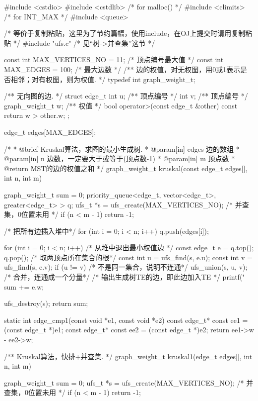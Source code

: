 \begin{Codex}[label=kruskal.c]
#include <cstdio>
#include <cstdlib>  /* for malloc() */
#include <climits>  /* for INT_MAX */
#include <queue>

/* 等价于复制粘贴，这里为了节约篇幅，使用include，在OJ上提交时请用复制粘贴 */
#include "ufs.c"  /* 见“树->并查集”这节 */

const int MAX_VERTICES_NO = 11; /* 顶点编号最大值 */
const int MAX_EDGES = 100;  /* 最大边数 */
/** 边的权值，对无权图，用0或1表示是否相邻；对有权图，则为权值. */
typedef int graph_weight_t;

/** 无向图的边. */
struct edge_t{
    int u;  /** 顶点编号 */
    int v;  /** 顶点编号 */
    graph_weight_t w;  /** 权值 */
    bool operator>(const edge_t &other) const {
        return w > other.w;
    }
};

edge_t edges[MAX_EDGES];


/*
  * @brief Kruskal算法，求图的最小生成树.
  * @param[in] edges 边的数组
  * @param[in] n 边数，一定要大于或等于(顶点数-1)
  * @param[in] m 顶点数
  * @return MST的边的权值之和
  */
graph_weight_t kruskal(const edge_t edges[], int n, int m) {
    graph_weight_t sum = 0;
    priority_queue<edge_t, vector<edge_t>,
                                greater<edge_t> > q;
    ufs_t *s = ufs_create(MAX_VERTICES_NO);  /* 并查集，0位置未用  */
    if (n < m - 1) return -1;

    /* 把所有边插入堆中*/
    for (int i = 0; i < n; i++) {
        q.push(edges[i]);
    }

    for (int i = 0; i < n; i++) {
        /* 从堆中退出最小权值边 */
        const edge_t e = q.top(); q.pop();
        /* 取两顶点所在集合的根*/
        const int u = ufs_find(s, e.u);
        const int v = ufs_find(s, e.v);
        if (u != v) { /* 不是同一集合，说明不连通*/
            ufs_union(s, u, v); /* 合并，连通成一个分量*/
            /* 输出生成树TE的边，即此边加入TE */
            printf("%
            sum += e.w;
        }
    }

    ufs_destroy(s);
    return sum;
}

static int edge_cmp1(const void *e1, const void *e2) {
    const edge_t* const ee1 = (const edge_t *)e1;
    const edge_t* const ee2 = (const edge_t *)e2;
    return ee1->w - ee2->w;
}

/** Kruskal算法，快排+并查集. */
graph_weight_t kruskal1(edge_t edges[], int n, int m) {
    graph_weight_t sum = 0;
    ufs_t *s = ufs_create(MAX_VERTICES_NO);  /* 并查集，0位置未用  */
    if (n < m - 1) return -1;

}
\end{Codex}
